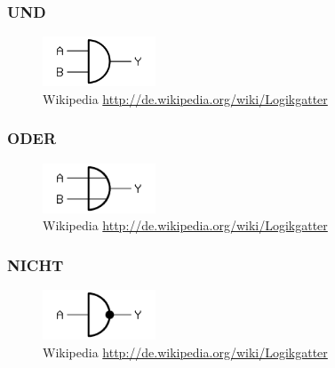 \documentclass[a4paper,12pt]{scrartcl}
\begin{document}
\subsubsection{UND}
\begin{figure}[ht]
	\centering
  \includegraphics[width=0.3\textwidth]{200px-Logic-gate-and-de.png}
	\caption{Wikipedia \url{http://de.wikipedia.org/wiki/Logikgatter}}
	\label{und}
\end{figure}

\subsubsection{ODER}
\begin{figure}[ht]
	\centering
  \includegraphics[width=0.3\textwidth]{Logic-gate-or-de.png}
	\caption{Wikipedia \url{http://de.wikipedia.org/wiki/Logikgatter}}
	\label{oder}
\end{figure}

\subsubsection{NICHT}
\begin{figure}[ht]
	\centering
  \includegraphics[width=0.3\textwidth]{Logic-gate-inv-de.png}
	\caption{Wikipedia \url{http://de.wikipedia.org/wiki/Logikgatter}}
	\label{nicht}
\end{figure}
\end{document}
